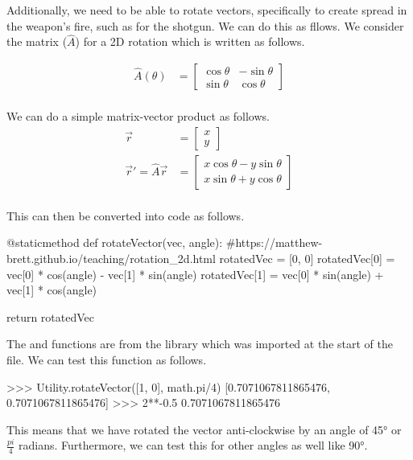 Additionally, we need to be able to rotate vectors, specifically to create spread in the weapon's fire, such as for the shotgun. We can do this as fllows. We consider the matrix ($\hat{A}$) for a 2D rotation which is written as follows.

\begin{align*}
    \hat{A}(\theta) &= \begin{bmatrix} \cos \theta & - \sin \theta \\ \sin \theta & \cos \theta \end{bmatrix}\\
\end{align*}

We can do a simple matrix-vector product as follows.
\begin{align*}
    \vec{r} &= \begin{bmatrix} x \\ y \end{bmatrix}\\
    \vec{r}' = \hat{A}\vec{r} &= \begin{bmatrix} x \cos \theta - y \sin \theta \\ x \sin \theta + y \cos \theta \end{bmatrix}\\
\end{align*}

This can then be converted into code as follows.

\begin{mpy}
    @staticmethod
    def rotateVector(vec, angle):
        #https://matthew-brett.github.io/teaching/rotation_2d.html
        rotatedVec = [0, 0]
        rotatedVec[0] = vec[0] * cos(angle) - vec[1] * sin(angle)
        rotatedVec[1] = vec[0] * sin(angle) + vec[1] * cos(angle)

        return rotatedVec
\end{mpy}

The  and  functions are from the  library which was imported at the start of the file. We can test this function as follows.

\begin{mpy}
>>> Utility.rotateVector([1, 0], math.pi/4)
[0.7071067811865476, 0.7071067811865476]
>>> 2**-0.5
0.7071067811865476
\end{mpy}

This means that we have rotated the vector anti-clockwise by an angle of \ang{45} or $\frac{pi}{4}$ radians. Furthermore, we can test this for other angles as well like \ang{90}.

